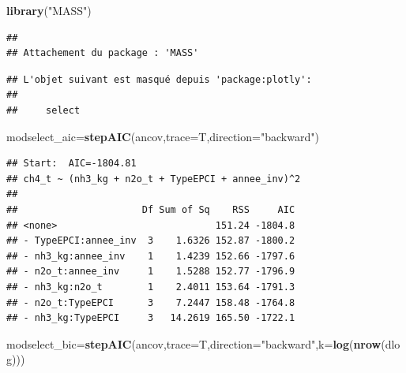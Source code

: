 \documentclass[
]{article}
\newenvironment{Shaded}{\begin{snugshade}}{\end{snugshade}}
\newcommand{\AttributeTok}[1]{\textcolor[rgb]{0.13,0.29,0.53}{#1}}
\newcommand{\FunctionTok}[1]{\textcolor[rgb]{0.13,0.29,0.53}{\textbf{#1}}}
\newcommand{\NormalTok}[1]{#1}
\newcommand{\OtherTok}[1]{\textcolor[rgb]{0.56,0.35,0.01}{#1}}
\newcommand{\StringTok}[1]{\textcolor[rgb]{0.31,0.60,0.02}{#1}}
\begin{document}
\begin{Shaded}
\begin{Highlighting}[]
\FunctionTok{library}\NormalTok{(}\StringTok{"MASS"}\NormalTok{)}
\end{Highlighting}
\end{Shaded}

\begin{verbatim}
## 
## Attachement du package : 'MASS'
\end{verbatim}

\begin{verbatim}
## L'objet suivant est masqué depuis 'package:plotly':
## 
##     select
\end{verbatim}

\begin{Shaded}
\begin{Highlighting}[]
\NormalTok{modselect\_aic}\OtherTok{=}\FunctionTok{stepAIC}\NormalTok{(ancov,}\AttributeTok{trace=}\NormalTok{T,}\AttributeTok{direction=}\StringTok{"backward"}\NormalTok{)}
\end{Highlighting}
\end{Shaded}

\begin{verbatim}
## Start:  AIC=-1804.81
## ch4_t ~ (nh3_kg + n2o_t + TypeEPCI + annee_inv)^2
## 
##                      Df Sum of Sq    RSS     AIC
## <none>                            151.24 -1804.8
## - TypeEPCI:annee_inv  3    1.6326 152.87 -1800.2
## - nh3_kg:annee_inv    1    1.4239 152.66 -1797.6
## - n2o_t:annee_inv     1    1.5288 152.77 -1796.9
## - nh3_kg:n2o_t        1    2.4011 153.64 -1791.3
## - n2o_t:TypeEPCI      3    7.2447 158.48 -1764.8
## - nh3_kg:TypeEPCI     3   14.2619 165.50 -1722.1
\end{verbatim}

\begin{Shaded}
\begin{Highlighting}[]
\NormalTok{modselect\_bic}\OtherTok{=}\FunctionTok{stepAIC}\NormalTok{(ancov,}\AttributeTok{trace=}\NormalTok{T,}\AttributeTok{direction=}\StringTok{"backward"}\NormalTok{,}\AttributeTok{k=}\FunctionTok{log}\NormalTok{(}\FunctionTok{nrow}\NormalTok{(dlog)))}
\end{Highlighting}
\end{Shaded}
\end{document}
